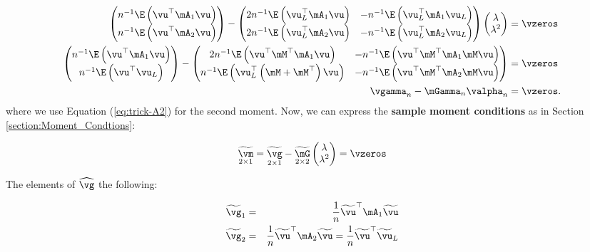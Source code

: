 \documentclass[english,12pt]{book}\usepackage[]{graphicx}\usepackage[]{xcolor}
\begin{document}
\begin{equation}\label{eq:system-gmm-general}
\begin{aligned}
  \begin{pmatrix}
    n^{-1}\E\left(\vu^\top\mA_1\vu \right)  \\
    n^{-1}\E\left(\vu^\top\mA_2\vu \right) 
  \end{pmatrix} -
  \begin{pmatrix}
    2n^{-1}\E\left(\vu_L^\top\mA_1\vu\right) &   -n^{-1}\E\left(\vu_L^\top\mA_1\vu_L\right)   \\
    2n^{-1}\E\left(\vu_L^\top\mA_2\vu\right) &   -n^{-1}\E\left(\vu_L^\top\mA_2\vu_L\right)
  \end{pmatrix}
  \begin{pmatrix}
  \lambda \\
  \lambda^2
  \end{pmatrix}
  & = \vzeros \\
    \begin{pmatrix}
    n^{-1}\E\left(\vu^\top\mA_1\vu \right)   \\
    n^{-1}\E\left(\vu^\top\vu_L \right) 
  \end{pmatrix}-
  \begin{pmatrix}
    2n^{-1}\E\left(\vu^\top\mM^\top\mA_1\vu\right) &   -n^{-1}\E\left(\vu^\top\mM^\top\mA_1\mM\vu\right)   \\
    n^{-1}\E\left(\vu_L^\top\left(\mM + \mM^\top\right)\vu\right) &   -n^{-1}\E\left(\vu^\top\mM^\top\mA_2\mM\vu\right)
  \end{pmatrix} & = \vzeros \\
  \vgamma_n - \mGamma_n\valpha_n &= \vzeros. 
\end{aligned}
\end{equation}
%
where we use Equation (\ref{eq:trick-A2}) for the second moment. Now, we can express the \textbf{sample moment conditions} as in Section \ref{section:Moment_Condtions}:

\begin{equation*}
	\underset{2 \times 1}{\widetilde{\vm}} = \underset{2 \times 1}{\widetilde{\vg}} - \underset{2 \times 2}{\widetilde{\mG}}\begin{pmatrix}\lambda \\ \lambda^2\end{pmatrix} = \vzeros
\end{equation*}

The elements of $\widehat{\vg}$ the following:


\begin{eqnarray*}
	\widetilde{\vg}_1  &=& \frac{1}{n}\widetilde{\vu}^\top\mA_1\widetilde{\vu} \\
\widetilde{\vg}_2  &=&  \frac{1}{n}\widetilde{\vu}^\top\mA_2\widetilde{\vu}   =  \frac{1}{n} \widetilde{\vu}^\top\widetilde{\vu}_L
\end{eqnarray*}
\end{document}
